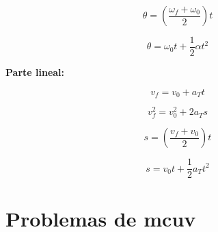 \begin{equation}
\theta = (\frac{\omega_f + \omega_0}{2})t
\end{equation}

\begin{equation}
\theta = \omega_0t+\frac{1}{2}\alpha t^2
\end{equation}

\textbf{Parte lineal:}

\begin{equation}
v_f = v_0 + a_Tt
\end{equation}

\begin{equation}
v_f^2 = v_0^2 +2a_Ts
\end{equation}

\begin{equation}
s = (\frac{v_f + v_0}{2})t
\end{equation}

\begin{equation}
s = v_0t+\frac{1}{2}a_Tt^2
\end{equation}


\section{Problemas de mcuv}

